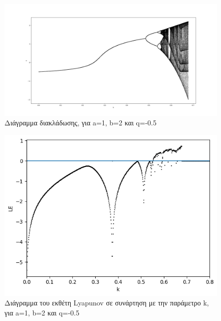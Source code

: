 \begin{figure}[h!]
	\centering
	\includegraphics[width=0.6\linewidth]{LateX images/graphs q05/g1}
	\caption{ Διάγραμμα διακλάδωσης, για a=1, b=2 και q=-0.5}
	\label{f:g10}
\end{figure}

\begin{figure}[h!]
	\centering
	\includegraphics[width=0.6\linewidth]{LateX images/graphs q05/g2}
	\caption{ Διάγραμμα του εκθέτη Lyapunov σε συνάρτηση με την παράμετρο k, για a=1, b=2 και q=-0.5}
	\label{f:g11}
\end{figure}


